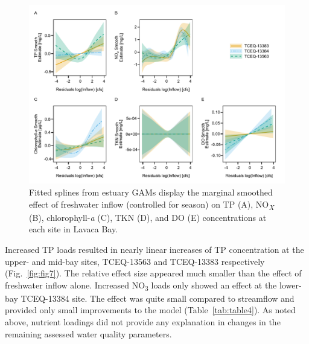 \documentclass[fleqn,10pt,lineno]{wlpeerj} %
\providecommand{\DIFaddbeginFL}{} %
\providecommand{\DIFaddendFL}{} %
\providecommand{\DIFdelbeginFL}{} %
\providecommand{\DIFdelendFL}{} %
\begin{document}
\begin{figure}

{\centering \DIFdelbeginFL %
\DIFdelendFL \DIFaddbeginFL \includegraphics[width=1\linewidth,]{Schramm-2023-08-PeerJ_files/figure-latex/fig6} 
\DIFaddendFL 

}

\caption{Fitted splines from estuary GAMs display the marginal smoothed effect of freshwater inflow (controlled for season) on TP (A), NO\textit{\textsubscript{X}} (B), chlorophyll-\textit{a} (C), TKN (D), and DO (E) concentrations at each site in Lavaca Bay.}\label{fig:fig6}
\end{figure}

Increased TP loads resulted in nearly linear increases of TP
concentration at the upper- and mid-bay sites, TCEQ-13563 and TCEQ-13383
respectively (Fig.~\ref{fig:fig7}). The relative effect size appeared
much smaller than the effect of freshwater inflow alone. Increased
NO\textsubscript{3} loads only showed an effect at the lower-bay
TCEQ-13384 site. The effect was quite small compared to streamflow and
provided only small improvements to the model (Table~\ref{tab:table4}).
As noted above, nutrient loadings did not provide any explanation in
changes in the remaining assessed water quality parameters.
\end{document}
